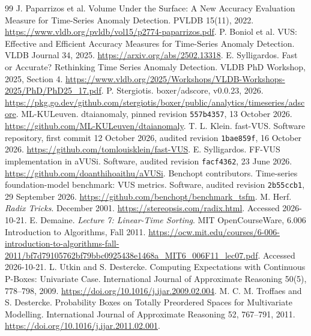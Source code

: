 \documentclass[10pt]{article}
\begin{document}






\begin{thebibliography}{99}
 J. Paparrizos et al. Volume Under the Surface: A New Accuracy Evaluation Measure for Time-Series Anomaly Detection. PVLDB 15(11), 2022. \url{https://www.vldb.org/pvldb/vol15/p2774-paparrizos.pdf}.
 P. Boniol et al. VUS: Effective and Efficient Accuracy Measures for Time-Series Anomaly Detection. VLDB Journal 34, 2025. \url{https://arxiv.org/abs/2502.13318}.
 E. Sylligardos. Fast or Accurate? Rethinking Time Series Anomaly Detection. VLDB PhD Workshop, 2025, Section 4. \url{https://www.vldb.org/2025/Workshops/VLDB-Workshops-2025/PhD/PhD25_17.pdf}.
 P. Stergiotis. boxer/adscore, v0.0.23, 2026. \url{https://pkg.go.dev/github.com/stergiotis/boxer/public/analytics/timeseries/adscore}.
 ML-KULeuven. dtaianomaly, pinned revision \texttt{557b4357}, 13 October 2026. \url{https://github.com/ML-KULeuven/dtaianomaly}.
 T. L. Klein. fast-VUS. Software repository, first commit 12 October 2026, audited revision \texttt{1bae859f}, 16 October 2026. \url{https://github.com/tomlouisklein/fast-VUS}.
 E. Sylligardos. FF-VUS implementation in aVUSi. Software, audited revision \texttt{facf4362}, 23 June 2026. \url{https://github.com/doanthihoaithu/aVUSi}.
 Benchopt contributors. Time-series foundation-model benchmark: VUS metrics. Software, audited revision \texttt{2b55ccb1}, 29 September 2026. \url{https://github.com/benchopt/benchmark_tsfm}.
 M. Herf. \emph{Radix Tricks}. December 2001. \url{https://stereopsis.com/radix.html}. Accessed 2026-10-21.
 E. Demaine. \emph{Lecture 7: Linear-Time Sorting}. MIT OpenCourseWare, 6.006 Introduction to Algorithms, Fall 2011. \url{https://ocw.mit.edu/courses/6-006-introduction-to-algorithms-fall-2011/bf7d79105762bf79bbc0925438e1468a_MIT6_006F11_lec07.pdf}. Accessed 2026-10-21.
 L. Utkin and S. Destercke. Computing Expectations with Continuous P-Boxes: Univariate Case. International Journal of Approximate Reasoning 50(5), 778--798, 2009. \url{https://doi.org/10.1016/j.ijar.2009.02.004}.
 M. C. M. Troffaes and S. Destercke. Probability Boxes on Totally Preordered Spaces for Multivariate Modelling. International Journal of Approximate Reasoning 52, 767--791, 2011. \url{https://doi.org/10.1016/j.ijar.2011.02.001}.

\end{thebibliography}
\end{document}
